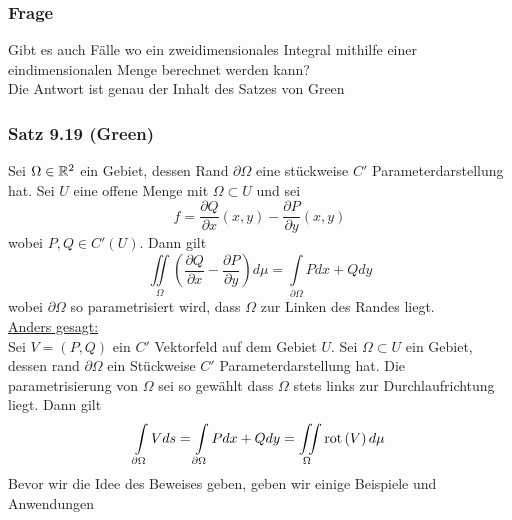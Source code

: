 \subsubsection*{Frage}
Gibt es auch Fälle wo ein zweidimensionales Integral mithilfe einer eindimensionalen Menge berechnet werden kann?\\

\noindent Die Antwort ist genau der Inhalt des Satzes von Green

\subsubsection*{Satz 9.19 (Green)}
Sei $\Omega \in\mathbb{R}^2$ ein Gebiet, dessen Rand $\partial\Omega$ eine stückweise $C'$ Parameterdarstellung hat. Sei $U$ eine offene Menge mit $\Omega\subset U$ und sei
\[ f=\frac{\partial Q}{\partial x}\left( x,y\right) -\frac{\partial P}{\partial y}\left( x,y\right) \]
wobei $P,Q\in C'\left( U\right)$. Dann gilt
\[ \iint\limits_\Omega \left(\frac{\partial Q}{\partial x}-\frac{\partial P}{\partial y}\right)d\mu = \int\limits_{\partial \Omega } {Pdx + Qdy} \]
wobei $\partial \Omega$ so parametrisiert wird, dass $\Omega$ zur Linken des Randes liegt. \\

\noindent\underline{Anders gesagt:}\\

\noindent Sei $V=\left( P,Q\right)$ ein $C'$ Vektorfeld auf dem Gebiet $U$. Sei $\Omega\subset U$ ein Gebiet, dessen rand $\partial\Omega$ ein Stückweise $C'$ Parameterdarstellung hat. Die parametrisierung von $\Omega$ sei so gewählt dass $\Omega$ stets links zur Durchlaufrichtung liegt. Dann gilt
\[\int\limits_{\partial \Omega } {Vds}  = \int\limits_{\partial \Omega } {Pdx + Qdy}  = \iint\limits_\Omega \operatorname{rot}\left( V \right)d\mu \]
Bevor wir die Idee des Beweises geben, geben wir einige Beispiele und Anwendungen


